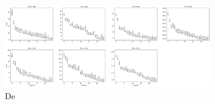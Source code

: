 \documentclass[12pt]{article}
\begin{document}
    \begin{figure}[H]
        \centering
        \includegraphics[width=0.8\textwidth]{de.png}
        \caption{De}
        \label{fig:de}
    \end{figure}
    \newpage
\end{document}

